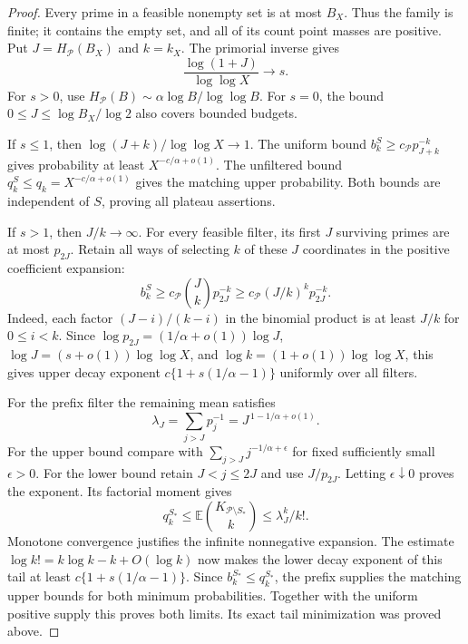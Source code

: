 \documentclass[11pt]{article}
\theoremstyle{definition}
\begin{document}
\begin{proof}
Every prime in a feasible nonempty set is at most $B_X$.
Thus the family is finite; it contains the empty set, and all
of its count point masses are positive.
Put $J=H_{\mathcal P}(B_X)$ and $k=k_X$.
The primorial inverse gives
\begin{equation}
 \frac{\log(1+J)}{\log\log X}\longrightarrow s.
 \label{eq:thin-prime-filter-budget-rank}
\end{equation}
For $s>0$, use
$H_{\mathcal P}(B)\sim\alpha\log B/\log\log B$.
For $s=0$, the bound $0\le J\le\log B_X/\log2$
also covers bounded budgets.

If $s\le1$, then $\log(J+k)/\log\log X\to1$.
The uniform bound $b_k^S\ge c_{\mathcal P}p_{J+k}^{-k}$
gives probability at least $X^{-c/\alpha+o(1)}$.
The unfiltered bound $q_k^S\le q_k=X^{-c/\alpha+o(1)}$
gives the matching upper probability.
Both bounds are independent of $S$, proving all plateau assertions.

If $s>1$, then $J/k\to\infty$.
For every feasible filter, its first $J$ surviving primes
are at most $p_{2J}$.
Retain all ways of selecting $k$ of these $J$ coordinates
in the positive coefficient expansion:
\begin{equation}
 b_k^S\ge c_{\mathcal P}{J\choose k}p_{2J}^{-k}
       \ge c_{\mathcal P}(J/k)^kp_{2J}^{-k}.
 \label{eq:thin-prime-filter-binomial-supply}
\end{equation}
Indeed, each factor $(J-i)/(k-i)$ in the binomial product
is at least $J/k$ for $0\le i<k$.
Since
$\log p_{2J}=(1/\alpha+o(1))\log J$,
$\log J=(s+o(1))\log\log X$, and
$\log k=(1+o(1))\log\log X$,
this gives upper decay exponent
$c\{1+s(1/\alpha-1)\}$ uniformly over all filters.

For the prefix filter the remaining mean satisfies
\[
 \lambda_J=\sum_{j>J}p_j^{-1}
                   =J^{\,1-1/\alpha+o(1)}.
\]
For the upper bound compare with
$\sum_{j>J}j^{-1/\alpha+\epsilon}$ for fixed sufficiently
small $\epsilon>0$.
For the lower bound retain $J<j\le2J$ and use $J/p_{2J}$.
Letting $\epsilon\downarrow0$ proves the exponent.
Its factorial moment gives
\[
 q_k^{S_*}\le
  \mathbb E{K_{\mathcal P\setminus S_*}\choose k}
              \le\lambda_J^k/k!.
\]
Monotone convergence justifies the infinite nonnegative expansion.
The estimate $\log k!=k\log k-k+O(\log k)$ now makes
the lower decay exponent of this tail at least
$c\{1+s(1/\alpha-1)\}$.
Since $b_k^{S_*}\le q_k^{S_*}$, the prefix supplies the
matching upper bounds for both minimum probabilities.
Together with the uniform positive supply this proves both limits.
Its exact tail minimization was proved above.
\end{proof}
\end{document}
